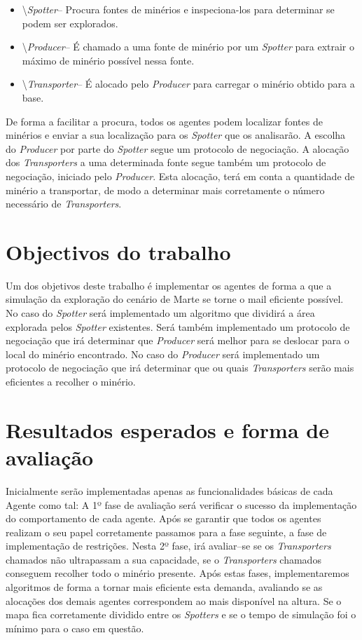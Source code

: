 \documentclass[12pt]{report}
\begin{document}
\begin{itemize}
  \item {\textbackslash}\textit{Spotter}– Procura fontes de minérios e inspeciona-los para determinar se podem ser explorados. 
  \item {\textbackslash}\textit{Producer}– É chamado a uma fonte de minério por um \textit{Spotter} para extrair o máximo de minério possível nessa fonte. 
  \item {\textbackslash}\textit{Transporter}– É alocado pelo \textit{Producer} para carregar o minério obtido para a base.
\end{itemize}

De forma a facilitar a procura, todos os agentes podem localizar fontes de minérios e enviar a sua localização para os \textit{Spotter} que os analisarão. A escolha do \textit{Producer} por parte do \textit{Spotter} segue um protocolo de negociação. A alocação dos \textit{Transporters} a uma determinada fonte segue também um protocolo de negociação, iniciado pelo \textit{Producer}. Esta alocação, terá em conta a quantidade de minério a transportar, de modo a determinar mais corretamente o número necessário de \textit{Transporters}.

\section{Objectivos do trabalho}

Um dos objetivos deste trabalho é implementar os agentes de forma a que a simulação da exploração do cenário de Marte se torne o mail eficiente possível. 
No caso do \textit{Spotter} será implementado um algoritmo que dividirá a área explorada pelos \textit{Spotter} existentes. Será também implementado um protocolo de negociação que irá determinar que \textit{Producer} será melhor para se deslocar para o local do minério encontrado.
No caso do \textit{Producer} será implementado um protocolo de negociação que irá determinar que ou quais \textit{Transporters} serão mais eficientes a recolher o minério.

\section{Resultados esperados e forma de avaliação}

Inicialmente serão implementadas apenas as funcionalidades básicas de cada Agente como tal:
A 1º fase de avaliação será verificar o sucesso da implementação do comportamento de cada agente. Após se garantir que todos os agentes realizam o seu papel corretamente passamos para a fase seguinte, a fase de implementação de restrições. 
Nesta 2º fase, irá avaliar–se se os \textit{Transporters} chamados não ultrapassam a sua capacidade, se o \textit{Transporters} chamados conseguem recolher todo o minério presente. 
Após estas fases, implementaremos algoritmos de forma a tornar mais eficiente esta demanda, avaliando se as alocações dos demais agentes correspondem ao mais disponível na altura. Se o mapa fica corretamente dividido entre os \textit{Spotters} e se o tempo de simulação foi o mínimo para o caso em questão.
\end{document}
